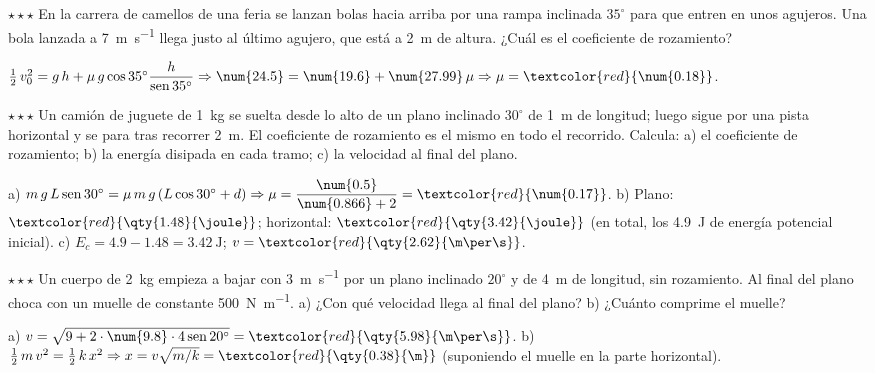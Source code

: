 \begin{exercise}
    \(\star\star\star\) En la carrera de camellos de una feria se lanzan bolas hacia arriba por una rampa inclinada \(35^\circ\) para que
    entren en unos agujeros. Una bola lanzada a \qty{7}{\m\per\s} llega justo al último agujero, que está a \qty{2}{\m} de altura. ¿Cuál
    es el coeficiente de rozamiento?
    \begin{solu}
        \(\frac{1}{2}\,v_0^2 = g\,h + \mu\,g\cos 35^\circ \dfrac{h}{\sen 35^\circ} \Rightarrow \num{24.5} = \num{19.6} + \num{27.99}\,\mu
        \Rightarrow \mu = \textcolor{red}{\num{0.18}}\).
    \end{solu}
\end{exercise}

\begin{exercise}
    \(\star\star\star\) Un camión de juguete de \qty{1}{\kg} se suelta desde lo alto de un plano inclinado \(30^\circ\) de \qty{1}{\m}
    de longitud; luego sigue por una pista horizontal y se para tras recorrer \qty{2}{\m}. El coeficiente de rozamiento es el mismo en todo
    el recorrido. Calcula: a) el coeficiente de rozamiento; b) la energía disipada en cada tramo; c) la velocidad al final del plano.
    \begin{solu}
        a) \(m\,g\,L\sen 30^\circ = \mu\,m\,g\,(L\cos 30^\circ + d) \Rightarrow \mu = \dfrac{\num{0.5}}{\num{0.866} + 2} = \textcolor{red}{\num{0.17}}\).
        b) Plano: \(\textcolor{red}{\qty{1.48}{\joule}}\); horizontal: \(\textcolor{red}{\qty{3.42}{\joule}}\) (en total, los
        \qty{4.9}{\joule} de energía potencial inicial). c) \(E_c = \num{4.9} - \num{1.48} = \qty{3.42}{\joule}\); \(v = \textcolor{red}{\qty{2.62}{\m\per\s}}\).
    \end{solu}
\end{exercise}

\begin{exercise}
    \(\star\star\star\) Un cuerpo de \qty{2}{\kg} empieza a bajar con \qty{3}{\m\per\s} por un plano inclinado \(20^\circ\) y de
    \qty{4}{\m} de longitud, sin rozamiento. Al final del plano choca con un muelle de constante \qty{500}{\newton\per\m}. a) ¿Con qué
    velocidad llega al final del plano? b) ¿Cuánto comprime el muelle?
    \begin{solu}
        a) \(v = \sqrt{9 + 2 \cdot \num{9.8} \cdot 4\sen 20^\circ} = \textcolor{red}{\qty{5.98}{\m\per\s}}\).
        b) \(\frac{1}{2}\,m\,v^2 = \frac{1}{2}\,k\,x^2 \Rightarrow x = v\sqrt{m/k} = \textcolor{red}{\qty{0.38}{\m}}\) (suponiendo el
        muelle en la parte horizontal).
    \end{solu}
\end{exercise}


